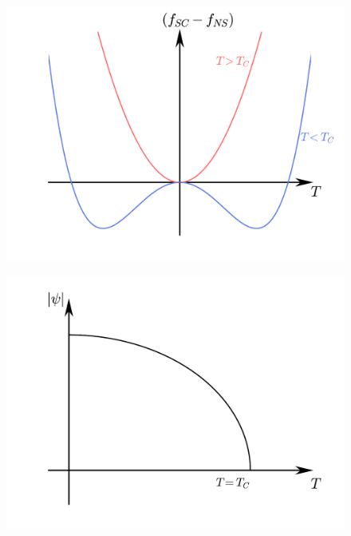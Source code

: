 \documentclass[10pt]{report}
\numberwithin{equation}{chapter}
\begin{document}
\begin{figure}[t]
  \begin{minipage}[c][6.50cm]{.5\textwidth}
    \vspace*{\fill}
    \centering
    \includegraphics[width=0.916\linewidth]{../img/landauginzburg_f_SC.pdf}
    \captionsetup{width=.95\linewidth}
    \label{fig:london_B_1dim}
  \end{minipage}%
  \begin{minipage}[c][6.00cm]{.5\textwidth}
    \vspace*{\fill}
    \centering
    \includegraphics[width=1.0\linewidth]{../img/landauginzburg_psi_T.pdf}
    \captionsetup{width=0.95\linewidth}
    \label{fig:london_lambda}
  \end{minipage}
\end{figure}
\end{document}
